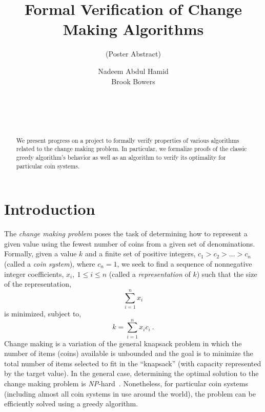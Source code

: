 \documentclass{acm_proc_article-sp}
\title{Formal Verification of Change Making Algorithms}
\subtitle{(Poster Abstract)}
\author{
\alignauthor
Nadeem Abdul Hamid\\
  \email{nadeem@acm.org}
\alignauthor
Brook Bowers\\
  \email{brook.bowers@vikings.berry.edu}
\and
  \affaddr{Berry College} \\
   \affaddr{Department of Mathematics and Computer Science}\\
  \affaddr{Mount Berry, GA 30149}\\
}
\begin{document}
\maketitle

\begin{abstract}
We present progress on a project to formally verify properties of various algorithms related to the change making problem. In particular, we formalize proofs of the  classic greedy algorithm's behavior as well as an algorithm to verify its optimality for particular coin systems.
\end{abstract}




\section{Introduction}

The \emph{change making problem} poses the task of determining how to represent a given value using the fewest number of coins from a given set of denominations. Formally, given a value $k$ and a finite set of positive integers, $c_1 > c_2 > \ldots > c_n$ (called a \emph{coin system}), where $c_n = 1$, we seek to find a sequence of nonnegative integer coefficients, $x_i,\ 1 \le i \le n$ (called a \emph{representation} of $k$) such that the size of the representation,
\[ \sum_{i=1}^{n}x_i \]
is minimized, subject to,
\[ k = \sum_{i=1}^{n}{x_i c_i}\ . \]
Change making is a variation of the general knapsack problem in which the number of items (coins) available is unbounded and the goal is to minimize the total number of items selected to fit in the ``knapsack'' (with capacity represented by the target value). In the general case, determining the optimal solution to the change making problem is \emph{NP}-hard~\cite{martello90}. Nonetheless, for particular coin systems (including almost all coin systems in use around the world), the problem can be efficiently solved using a greedy algorithm. 
\end{document}
